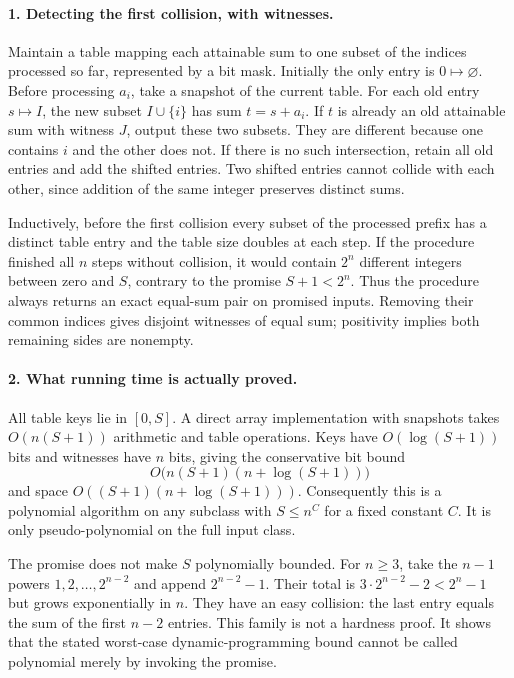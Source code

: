 \documentclass[11pt,a4paper]{article}
\begin{document}
\paragraph{1. Detecting the first collision, with witnesses.}
Maintain a table mapping each attainable sum to one subset of the
indices processed so far, represented by a bit mask. Initially the
only entry is $0\mapsto\varnothing$. Before processing $a_i$, take
a snapshot of the current table. For each old entry $s\mapsto I$,
the new subset $I\cup\{i\}$ has sum $t=s+a_i$. If $t$ is already
an old attainable sum with witness $J$, output these two subsets.
They are different because one contains $i$ and the other does not.
If there is no such intersection, retain all old entries and add
the shifted entries. Two shifted entries cannot collide with each
other, since addition of the same integer preserves distinct sums.

Inductively, before the first collision every subset of the processed
prefix has a distinct table entry and the table size doubles at
each step. If the procedure finished all $n$ steps without collision,
it would contain $2^n$ different integers between zero and $S$,
contrary to the promise $S+1<2^n$. Thus the procedure always returns
an exact equal-sum pair on promised inputs. Removing their common
indices gives disjoint witnesses of equal sum; positivity implies
both remaining sides are nonempty.

\paragraph{2. What running time is actually proved.}
All table keys lie in $[0,S]$. A direct array implementation with
snapshots takes $O(n(S+1))$ arithmetic and table operations. Keys
have $O(\log(S+1))$ bits and witnesses have $n$ bits, giving the
conservative bit bound
\[
 O\bigl(n(S+1)(n+\log(S+1))\bigr)
\]
and space $O((S+1)(n+\log(S+1)))$. Consequently this is a polynomial
algorithm on any subclass with $S\le n^C$ for a fixed constant $C$.
It is only pseudo-polynomial on the full input class.

The promise does not make $S$ polynomially bounded. For $n\ge3$,
take the $n-1$ powers $1,2,\ldots,2^{n-2}$ and append
$2^{n-2}-1$. Their total is $3\cdot2^{n-2}-2<2^n-1$ but grows
exponentially in $n$. They have an easy collision: the last entry
equals the sum of the first $n-2$ entries. This family is not a
hardness proof. It shows that the stated worst-case dynamic-programming
bound cannot be called polynomial merely by invoking the promise.
\end{document}
